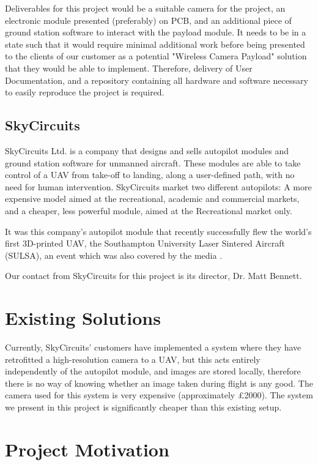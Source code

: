 Deliverables for this project would be a suitable camera for the project, an electronic module presented (preferably) on PCB, and an additional piece of ground station software to interact with the payload module. It needs to be in a state such that it would require minimal additional work before being presented to the clients of our customer as a potential "Wireless Camera Payload" solution that they would be able to implement. Therefore, delivery of User Documentation, and a repository containing all hardware and software necessary to easily reproduce the project is required.

\subsection{SkyCircuits}

SkyCircuits Ltd. \cite{SkyCircuits} is a company that designs and sells autopilot modules and ground station software for unmanned aircraft. These modules are able to take control of a UAV from take-off to landing, along a user-defined path, with no need for human intervention. SkyCircuits market two different autopilots: A more expensive model aimed at the recreational, academic and commercial markets, and a cheaper, less powerful module, aimed at the Recreational market only.

It was this company's autopilot module that recently successfully flew the world's first 3D-printed UAV, the Southampton University Laser Sintered Aircraft (SULSA), \cite{SULSA} an event which was also covered by the media \cite{SC_Press}.

Our contact from SkyCircuits for this project is its director, Dr. Matt Bennett.

\section{Existing Solutions}
\label{sec:existing_soln}

Currently, SkyCircuits' customers have implemented a system where they have retrofitted a high-resolution camera to a UAV, but this acts entirely independently of the autopilot module, and images are stored locally, therefore there is no way of knowing whether an image taken during flight is any good. The camera used for this system is very expensive (approximately \pounds 2000). The system we present in this project is significantly cheaper than this existing setup.

\section{Project Motivation}

